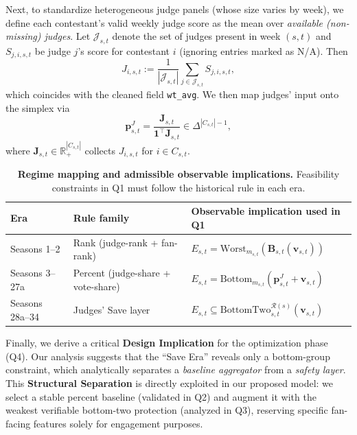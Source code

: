 Next, to standardize heterogeneous judge panels (whose size varies by week), we define each contestant's valid weekly judge score as the mean over \emph{available (non-missing) judges}. Let $\mathcal{J}_{s,t}$ denote the set of judges present in week $(s,t)$ and $S_{j,i,s,t}$ be judge $j$'s score for contestant $i$ (ignoring entries marked as N/A). Then
\[
J_{i,s,t}:=\frac{1}{|\mathcal{J}_{s,t}|}\sum_{j\in\mathcal{J}_{s,t}} S_{j,i,s,t},
\]
which coincides with the cleaned field \texttt{wt\_avg}. We then map judges' input onto the simplex via
\begin{equation}
\mathbf{p}^{J}_{s,t}=\frac{\mathbf{J}_{s,t}}{\mathbf{1}^\top \mathbf{J}_{s,t}}\in\Delta^{|C_{s,t}|-1},
\label{eq:q1_jshare}
\end{equation}
where $\mathbf{J}_{s,t}\in\mathbb{R}_+^{|C_{s,t}|}$ collects $J_{i,s,t}$ for $i\in C_{s,t}$.


\begin{table}[h]
\centering
\small
\setlength{\tabcolsep}{5pt}
\renewcommand{\arraystretch}{1.05}
\caption{\textbf{Regime mapping and admissible observable implications.} Feasibility constraints in Q1 must follow the historical rule in each era.}
\label{tab:q1_regime_map}
\begin{tabular}{lll}
\toprule
Era & Rule family & Observable implication used in Q1 \\
\midrule
Seasons 1--2 & Rank (judge-rank + fan-rank) & $E_{s,t}= \mathrm{Worst}_{m_{s,t}}(\mathbf{B}_{s,t}(\mathbf v_{s,t}))$ \\
Seasons 3--27a & Percent (judge-share + vote-share) & $E_{s,t}=\mathrm{Bottom}_{m_{s,t}}(\mathbf{p}^{J}_{s,t}+\mathbf{v}_{s,t})$ \\
Seasons 28a--34 & Judges' Save layer & $E_{s,t}\subseteq \mathrm{BottomTwo}^{\mathcal{R}(s)}_{s,t}(\mathbf v_{s,t})$ \\
\bottomrule
\end{tabular}
\end{table}

Finally, we derive a critical \textbf{Design Implication} for the optimization phase (Q4). Our analysis suggests that the ``Save Era'' reveals only a bottom-group constraint, which analytically separates a \emph{baseline aggregator} from a \emph{safety layer}. This \textbf{Structural Separation} is directly exploited in our proposed model: we select a stable percent baseline (validated in Q2) and augment it with the weakest verifiable bottom-two protection (analyzed in Q3), reserving specific fan-facing features solely for engagement purposes.

